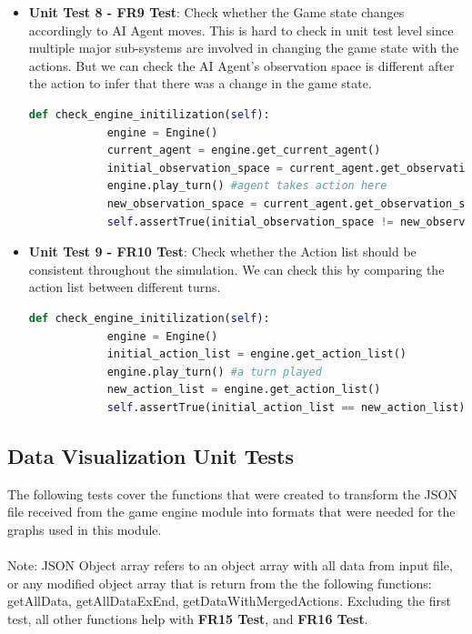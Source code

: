 \documentclass[12pt, titlepage]{article}
\begin{document}
\begin{itemize}
    \item \textbf{Unit Test 8 - FR9 Test}: Check whether the Game state changes accordingly to AI Agent moves. This is hard to check in unit test level since multiple major sub-systems are involved in changing the game state with the actions. But we can check the AI Agent's observation space is different after the action to infer that there was a change in the game state. 
    
    \begin{lstlisting}[language=Python]
        def check_engine_initilization(self):
            engine = Engine()
            current_agent = engine.get_current_agent()
            initial_observation_space = current_agent.get_observation_space()
            engine.play_turn() #agent takes action here
            new_observation_space = current_agent.get_observation_space()
            self.assertTrue(initial_observation_space != new_observation_space)
    \end{lstlisting}    

    \item \textbf{Unit Test 9 - FR10 Test}: Check whether the  Action list should be consistent throughout the simulation. We can check this by comparing the action list between different turns.
    
    \begin{lstlisting}[language=Python]
        def check_engine_initilization(self):
            engine = Engine()
            initial_action_list = engine.get_action_list()
            engine.play_turn() #a turn played
            new_action_list = engine.get_action_list()
            self.assertTrue(initial_action_list == new_action_list)
    \end{lstlisting}  
  
\end{itemize}
\newpage
\subsection{Data Visualization Unit Tests}
The following tests cover the functions that were created to transform the JSON file received from the game engine module into formats that were needed for the graphs used in this module.
\\\\
Note: JSON Object array refers to an object array with all data from input file, or any modified object array that is return from the the following functions: getAllData, getAllDataExEnd, getDataWithMergedActions. Excluding the first test, all other functions help with \textbf{FR15 Test}, and \textbf{FR16 Test}.
\end{document}
